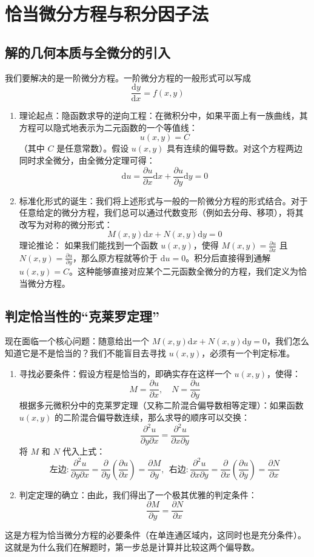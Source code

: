 \documentclass[lang=cn,11pt]{elegantbook}
\begin{document}
\section{恰当微分方程与积分因子法}

\subsection{解的几何本质与全微分的引入}

我们要解决的是一阶微分方程。一阶微分方程的一般形式可以写成 \[\frac{\mathrm{d}y}{\mathrm{d}x} = f(x,y)\]
\begin{enumerate}
    \item 理论起点：隐函数求导的逆向工程：在微积分中，如果平面上有一族曲线，其方程可以隐式地表示为二元函数的一个等值线：$$u(x,y) = C$$（其中 $C$ 是任意常数）。假设 $u(x,y)$ 具有连续的偏导数。对这个方程两边同时求全微分，由全微分定理可得：$$\mathrm{d}u = \frac{\partial u}{\partial x}\mathrm{d}x + \frac{\partial u}{\partial y}\mathrm{d}y = 0$$
    \item 标准化形式的诞生：我们将上述形式与一般的一阶微分方程的形式结合。对于任意给定的微分方程，我们总可以通过代数变形（例如去分母、移项），将其改写为对称的微分形式：$$M(x,y)\mathrm{d}x + N(x,y)\mathrm{d}y = 0$$理论推论： 如果我们能找到一个函数 $u(x,y)$，使得 $M(x,y) = \frac{\partial u}{\partial x}$ 且 $N(x,y) = \frac{\partial u}{\partial y}$，那么原方程就等价于 $\mathrm{d}u = 0$。积分后直接得到通解 $u(x,y) = C$。这种能够直接对应某个二元函数全微分的方程，我们定义为恰当微分方程。
\end{enumerate}

\subsection{判定恰当性的“克莱罗定理”}

现在面临一个核心问题：随意给出一个 $M(x,y)\mathrm{d}x + N(x,y)\mathrm{d}y = 0$，我们怎么知道它是不是恰当的？我们不能盲目去寻找 $u(x,y)$，必须有一个判定标准。
\begin{enumerate}
    \item 寻找必要条件：假设方程是恰当的，即确实存在这样一个 $u(x,y)$，使得：$$M = \frac{\partial u}{\partial x}, \quad N = \frac{\partial u}{\partial y}$$
    根据多元微积分中的克莱罗定理（又称二阶混合偏导数相等定理）：如果函数 $u(x,y)$ 的二阶混合偏导数连续，那么求导的顺序可以交换：$$\frac{\partial^2 u}{\partial y \partial x} = \frac{\partial^2 u}{\partial x \partial y}$$
    将 $M$ 和 $N$ 代入上式：
    \[\text{左边}:\frac{\partial^2 u}{\partial y \partial x} = \frac{\partial}{\partial y}\left(\frac{\partial u}{\partial x}\right) = \frac{\partial M}{\partial y},~~\text{右边}:\frac{\partial^2 u}{\partial x \partial y} = \frac{\partial}{\partial x}\left(\frac{\partial u}{\partial y}\right) = \frac{\partial N}{\partial x}\]
    \item 判定定理的确立：由此，我们得出了一个极其优雅的判定条件：$$\frac{\partial M}{\partial y} = \frac{\partial N}{\partial x}$$
\end{enumerate}
这是方程为恰当微分方程的必要条件（在单连通区域内，这同时也是充分条件）。这就是为什么我们在解题时，第一步总是计算并比较这两个偏导数。
\end{document}
